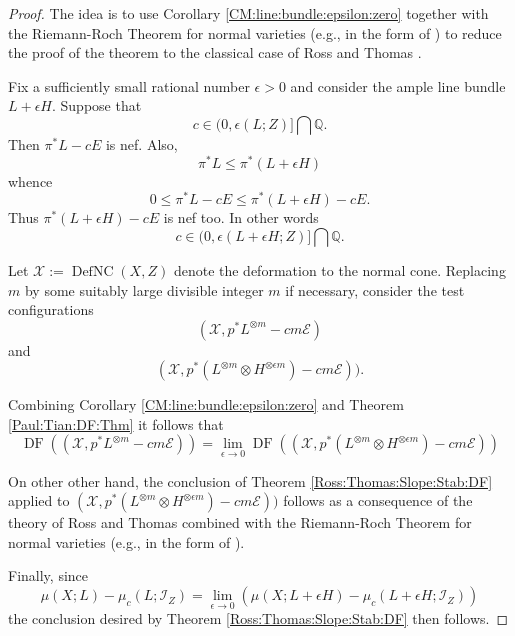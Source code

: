 \documentclass[12pt]{amsart}
\renewcommand{\leq}{\leqslant}
\newcommand{\Ish}{\mathcal{I}}
\newcommand{\QQ}{\mathbb{Q}} %
\theoremstyle{definition}
\numberwithin{equation}{section}
\begin{document}
\begin{proof}
The idea is to use Corollary \ref{CM:line:bundle:epsilon:zero} together with the Riemann-Roch Theorem for normal varieties (e.g., in the form of \cite[Theorem A.1]{Boucksom-Hisamoto-Jonsson:2016}) to reduce the proof of the theorem to the classical case of Ross and Thomas \cite[Section 4]{Ross:Thomas:2007}.  

Fix a sufficiently small rational number $\epsilon > 0$ and consider the ample line bundle $L + \epsilon H$.  Suppose that 
$$c \in (0,\epsilon(L;Z)] \bigcap \QQ \text{.}$$  
Then $\pi^*L - c E$ is nef.  Also, 
$$\pi^*L \leq \pi^*(L+ \epsilon H)$$ 
whence 
$$0 \leq \pi^*L - c E \leq \pi^*(L+\epsilon H) - c E\text{.}$$  
Thus $\pi^*(L+\epsilon H) - c E$ is nef too.    In other words
$$
c \in (0,\epsilon(L+\epsilon H;Z)] \bigcap \QQ \text{.}
$$

Let $\mathcal{X} := \operatorname{DefNC}(X,Z)$ denote the deformation to the normal cone.   Replacing $m$ by some suitably large divisible integer $m$ if necessary, consider the test configurations 
$$(\mathcal{X}, p^*L^{\otimes m} - c m \mathcal{E})$$ 
and
$$(\mathcal{X}, p^*(L^{\otimes  m}  \otimes H^{\otimes \epsilon m}) - cm \mathcal{E}) ) \text{.}$$

Combining Corollary \ref{CM:line:bundle:epsilon:zero} and Theorem \ref{Paul:Tian:DF:Thm} it follows that
$$
\operatorname{DF}( (\mathcal{X}, p^*L^{\otimes m} - c m \mathcal{E}) ) = \lim\limits_{\epsilon \to 0} \operatorname{DF}( (\mathcal{X}, p^*(L^{\otimes m}  \otimes H^{\otimes \epsilon m}) - cm \mathcal{E})  ) 
$$

On other other hand, the conclusion of Theorem \ref{Ross:Thomas:Slope:Stab:DF} applied to $(\mathcal{X}, p^*(L^{\otimes  m}  \otimes H^{\otimes \epsilon m}) - cm \mathcal{E})  )$ follows as a consequence of the theory of Ross and Thomas \cite[Section 4]{Ross:Thomas:2007} combined  with the Riemann-Roch Theorem for normal varieties (e.g., in the form of \cite[Theorem A.1]{Boucksom-Hisamoto-Jonsson:2016}).

Finally, since
$$
\mu(X;L) - \mu_c(L;\Ish_Z) = \lim\limits_{\epsilon \to 0} (\mu(X;L+\epsilon H) - \mu_c(L+\epsilon H;\Ish_Z) )
$$
the conclusion desired by Theorem \ref{Ross:Thomas:Slope:Stab:DF} then follows.
\end{proof}
\end{document}
